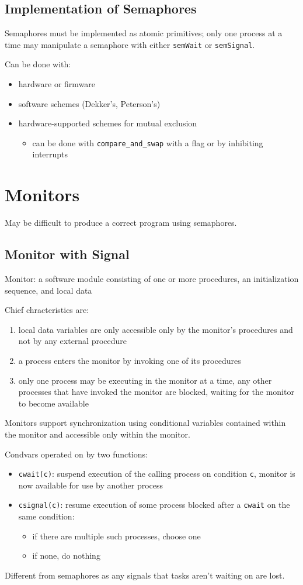 \documentclass[11pt]{article}
\begin{document}
\subsection{Implementation of Semaphores}
\label{sec:org9ef2086}
Semaphores must be implemented as atomic primitives;
only one process at a time may manipulate a
semaphore with either \texttt{semWait} or \texttt{semSignal}.

Can be done with:
\begin{itemize}
\item hardware or firmware
\item software schemes (Dekker's, Peterson's)
\item hardware-supported schemes for mutual exclusion
\begin{itemize}
\item can be done with \texttt{compare\_and\_swap} with a flag or by
inhibiting interrupts
\end{itemize}
\end{itemize}
\section{Monitors}
\label{sec:org38c8770}
May be difficult to produce a correct program using semaphores.
\subsection{Monitor with Signal}
\label{sec:org00c64c3}
Monitor: a software module consisting of one or more procedures,
an initialization sequence, and local data

Chief chracteristics are:
\begin{enumerate}
\item local data variables are only accessible only by the monitor's
procedures and not by any external procedure
\item a process enters the monitor by invoking one of its procedures
\item only one process may be executing in the monitor at a time,
any other processes that have invoked the monitor are blocked,
waiting for the monitor to become available
\end{enumerate}

Monitors support synchronization using conditional variables
contained within the monitor and accessible only within the monitor.

Condvars operated on by two functions:
\begin{itemize}
\item \texttt{cwait(c)}: suspend execution of the calling process on
condition \texttt{c}, monitor is now available for use by another process
\item \texttt{csignal(c)}: resume execution of some process blocked after a \texttt{cwait}
on the same condition:
\begin{itemize}
\item if there are multiple such processes, choose one
\item if none, do nothing
\end{itemize}
\end{itemize}
Different from semaphores as any signals that tasks aren't waiting on
are lost.
\end{document}
